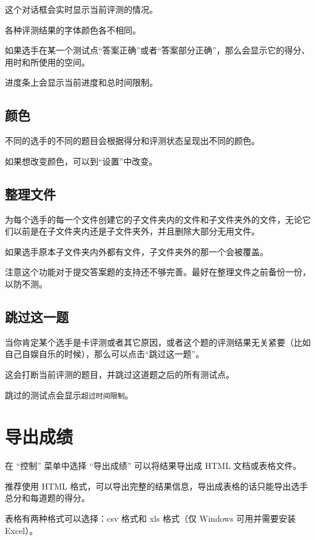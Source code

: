 \documentclass[UTF-8]{ctexart}
\begin{document}
    这个对话框会实时显示当前评测的情况。

    各种评测结果的字体颜色各不相同。

    如果选手在某一个测试点“答案正确”或者“答案部分正确”，那么会显示它的得分、用时和所使用的空间。

    进度条上会显示当前进度和总时间限制。

    \subsection{颜色}

    不同的选手的不同的题目会根据得分和评测状态呈现出不同的颜色。

    如果想改变颜色，可以到“设置”中改变。

    \subsection{整理文件}

    为每个选手的每一个文件创建它的子文件夹内的文件和子文件夹外的文件，无论它们以前是在子文件夹内还是子文件夹外，并且删除大部分无用文件。

    如果选手原本子文件夹内外都有文件，子文件夹外的那一个会被覆盖。

    注意这个功能对于提交答案题的支持还不够完善。最好在整理文件之前备份一份，以防不测。

    \subsection{跳过这一题}

    当你肯定某个选手是卡评测或者其它原因，或者这个题的评测结果无关紧要（比如自己自娱自乐的时候），那么可以点击“跳过这一题”。

    这会打断当前评测的题目，并跳过这道题之后的所有测试点。

    跳过的测试点会显示\texttt{超过时间限制}。

    \newpage

    \section{导出成绩}

    在 “控制” 菜单中选择 “导出成绩” 可以将结果导出成 HTML 文档或表格文件。

    推荐使用 HTML 格式，可以导出完整的结果信息，导出成表格的话只能导出选手总分和每道题的得分。

    表格有两种格式可以选择：csv 格式和 xls 格式（仅 Windows 可用并需要安装 Excel）。
\end{document}
